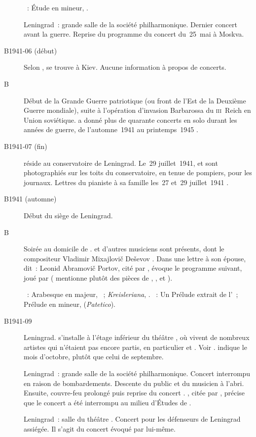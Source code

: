 \begin{description}
 \textsc{\Scriabine{}}~: Étude en \kD \Sharp mineur,  .
 \item[\DateWithWeekDay{1941-05-28}]
 Leningrad~: grande salle de la société philharmonique.
 Dernier concert avant la guerre.
 Reprise du programme du concert du~25~mai à Moskva.
 \item[B1941-06 (début)]
 Selon \ASofronitsky{}, \VSofronitsky{} se trouve à Kiev.
 Aucune information à propos de concerts.
 \item[B\DateWithWeekDay{1941-06-22}]
 Début de la Grande Guerre patriotique (ou front de l'\hbox{Est} de la
 Deuxième Guerre mondiale), suite à l'opération d'invasion Barbarossa du
 \textsc{iii}\ieme{}~Reich en Union soviétique.
 \VSofronitsky{} a donné plus de quarante concerts en solo durant les années
 de guerre, de l'automne~1941 au printemps~1945 \citep[p.~167]{Nekrasova08}.
 \item[B1941-07 (fin)]
 \VSofronitsky{} réside au conservatoire de Leningrad.
 Le~29 juillet~1941, \DChostakovitch{} et \VSofronitsky{} sont photographiés
 sur les toits du conservatoire, en tenue de pompiers, pour les journaux.
 Lettres du pianiste à sa famille les~27 et~29 juillet~1941
 \citep[p.~31]{Kogan08}.
 \item[B1941 (automne)]
 Début du siège de Leningrad.
 \item[B\DateWithWeekDay{1941-09-01}]
 Soirée au domicile de \VBogdanovBerezovsky{}.
 \IMiklashevsky{} et d'autres musiciens sont présents, dont le compositeur
 Vladimir Mixajlovič Deševov \citep[voir][]{Bogdanov67a}.
 Dans une lettre à son épouse, \VSofronitsky{} dit~: 
 Leonid Abramovič Portov, cité par \citet[p.~202-203]{Sofronitsky13b},
 évoque le programme suivant, joué par \Sofronitsky{} (\BogdanovBerezovsky{}
 mentionne plutôt des pièces de \Prokofiev{}, \Scriabine{}, \Schumann{} et
 \Debussy{}).

 \textsc{\Schumann{}}~: Arabesque en \kC majeur, ~;
 \emph{Kreisleriana}, .
 \textsc{\Scriabine{}}~: Un Prélude extrait de l'~; Prélude en \kG
 mineur,   (\emph{Patetico}).
 \item[B1941-09]
 Leningrad.
 \VSofronitsky{} s'installe à l'étage inférieur du théâtre \Pouchkine{}, où
 vivent de nombreux artistes qui n'étaient pas encore partis, en particulier
 \DShafran{} et \DChostakovitch{}.
 Voir \citet[p.~58]{Juban}.
 \citet[p.~165]{Nekrasova08} indique le mois d'octobre, plutôt que celui de
 septembre.
 \item[\DateWithWeekDay{1941-11-07}]
 Leningrad~: grande salle de la société philharmonique.
 Concert interrompu en raison de bombardements.
 Descente du public et du musicien à l'abri.
 Ensuite, couvre-feu prolongé puis reprise du concert
 \citep[voir][p.~164]{Nekrasova08}.
 \citet[p.~342]{Savkevich}, citée par \citet[p.~203]{Sofronitsky13b},
 précise que le concert a été interrompu au milieu d'\hbox{Études} de
 \Chopin{}.
 \item[\DateWithWeekDay{1941-12-12}]
 Leningrad~: salle du théâtre \Pouchkine{}.
 Concert pour les défenseurs de Leningrad assiégée.
 Il s'agit du concert évoqué par \citet{Sofronitsky42, Sofronitsky61}
 lui-même.
\end{description}


